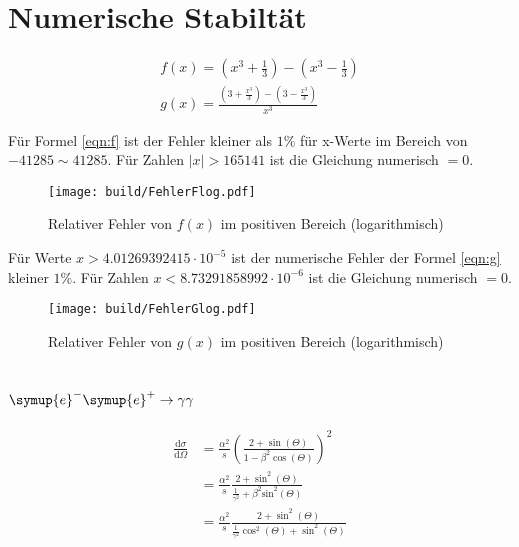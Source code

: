 



\section{Numerische Stabiltät}

\begin{gather}
  f(x)=\left(x^3+\frac{1}{3}\right)-\left(x^3-\frac{1}{3}\right)\label{eqn:f}\\
  g(x)=\frac{\left(3+\frac{x^3}{3}\right)-\left(3-\frac{x^3}{3}\right)}{x^3}\label{eqn:g}
\end{gather}

\noindent Für Formel \eqref{eqn:f} ist der Fehler kleiner als $1\%$ für x-Werte im Bereich von $-41285 \sim 41285$.
Für Zahlen $|x|>165141$ ist die Gleichung numerisch $=0$.

\begin{figure}
  \centering
  \texttt{[image: build/FehlerFlog.pdf]}
  \caption{Relativer Fehler von $f(x)$ im positiven Bereich (logarithmisch)}
  \label{fig:FehlerFlog}
\end{figure}

\noindent Für Werte $x>4.01269392415 \cdot 10^{-5}$ ist der numerische Fehler der Formel \eqref{eqn:g} kleiner $1\%$.
Für Zahlen $x<8.73291858992 \cdot 10^{-6}$ ist die Gleichung numerisch $=0$.

\begin{figure}
  \centering
  \texttt{[image: build/FehlerGlog.pdf]}
  \caption{Relativer Fehler von $g(x)$ im positiven Bereich (logarithmisch)}
  \label{fig:FehlerGlog}
\end{figure}

\section{\texorpdfstring{$\symup{e}^-\symup{e}^+\rightarrow\gamma \gamma$}{Paarvernichtung}}

\begin{align}
    \frac{\mathrm{d}\sigma}{\mathrm{d}\Omega} &= \frac{\alpha^2}{s} \left(\frac{2+\sin(\Theta)}{1-\beta^2 \cos(\Theta)}\right)^2\label{eqn:WQStandard}\\
&= \frac{\alpha^2}{s} \frac{2+\sin^2(\Theta)}{\frac{1}{\gamma^2}+\beta^2 \text{sin}^2(\Theta)}\\
&= \frac{\alpha^2}{s}\frac{2+\sin^2(\Theta)}{\frac{1}{\gamma^2}\cos^2(\Theta)+\sin^2(\Theta)}\label{eqn:WQModifiziert}
\end{align}


